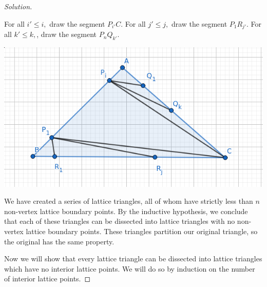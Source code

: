 \documentclass[12pt]{article}
\newenvironment{exercise}[2][Exercise]{\begin{trivlist}
        \item[\hskip \labelsep {\bfseries #1}\hskip \labelsep {\bfseries #2.}]}{\end{trivlist}}
\newenvironment{solution}
        {\begin{proof}[Solution]}
                    {\end{proof}}
\begin{document}
\begin{exercise}{45}
\begin{solution}
\begin{center}
        \end{center}
        For all \( i' \leq i, \) draw the segment \( P_{i'} C. \) For all \( j' \leq j ,\) draw the segment \( P_{1} R_{j'} . \) For all \( k' \leq k , \), draw the segment \( P_{n} Q_{k'} . \)
        \begin{center}
            \includegraphics[scale=.5]{45-3}
        \end{center}
        We have created a series of lattice triangles, all of whom have strictly less than \( n \) non-vertex lattice boundary points. By the inductive hypothesis, we conclude that each of these triangles can be dissected into lattice triangles with no non-vertex lattice boundary points. These triangles partition our original triangle, so the original has the same property.

        Now we will show that every lattice triangle can be dissected into lattice triangles which have no interior lattice points. We will do so by induction on the number of interior lattice points.


\end{solution}
\end{exercise}
\end{document}
